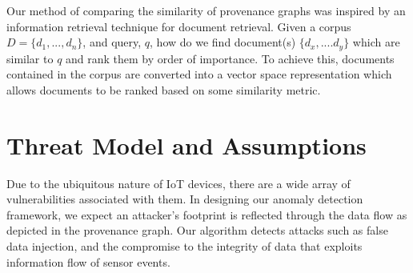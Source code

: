 %
%




\par Our method of comparing the similarity of provenance graphs was inspired by an information retrieval technique for document retrieval. Given a corpus $D = \{ d_1,..., d_n\}$, and query, $q$, how do we find document(s) $\{d_x,....d_y\}$ which are similar to $q$ and rank them by order of importance. To achieve this, documents contained in the corpus are converted into a vector space representation which allows documents to be ranked based on some similarity metric.



\section{Threat Model and Assumptions}
Due to the ubiquitous nature of IoT devices, there are a wide array of vulnerabilities associated with them. In designing our anomaly detection framework, we expect an attacker's footprint is reflected through the data flow as depicted in the provenance graph. Our algorithm detects attacks such as false data injection, and the compromise to the integrity of data that exploits information flow of sensor events. 





%

